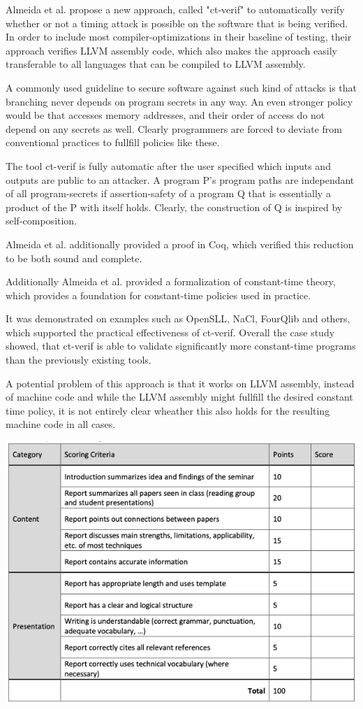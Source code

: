 \documentclass[a4paper,UKenglish]{lipics-v2018}
\begin{document}

Almeida et al. propose a new approach, called "ct-verif" to automatically verify whether  or not a timing attack is possible on the software that is being verified. In order to include most compiler-optimizations in their baseline of testing, their approach verifies LLVM assembly code, which also makes the approach easily transferable to all languages that can be compiled to LLVM assembly.\cite{verifying_constant_time_implementations}

A commonly used guideline to secure software against such kind of attacks is that branching never depends on program secrets in any way. An even stronger policy would be that accesses memory addresses, and their order of access do not depend on any secrets as well. Clearly programmers are forced to deviate from conventional practices to fullfill policies like these.\cite{verifying_constant_time_implementations}

The tool ct-verif is fully automatic after the user specified which inputs and outputs are public to an attacker. A program P's program paths are independant of all program-secrets if assertion-safety of a program Q that is essentially a product of the P with itself holds.\cite{verifying_constant_time_implementations} Clearly, the construction of Q is inspired by self-composition. 

Almeida et al. additionally provided a proof in Coq, which verified this reduction to be both sound and complete.\cite{verifying_constant_time_implementations}

Additionally Almeida et al. provided a formalization of constant-time theory, which provides a foundation for constant-time policies used in practice.

It was demonstrated on examples such as OpenSLL, NaCl, FourQlib and others, which supported the practical effectiveness of ct-verif. Overall the case study showed, that ct-verif is able to validate significantly more constant-time programs than the previously existing tools.\cite{verifying_constant_time_implementations}

A potential problem of this approach is that it works on LLVM assembly, instead of machine code and while the LLVM assembly might fullfill the desired constant time policy, it is not entirely clear wheather this also holds for the resulting machine code in all cases.\cite{verifying_constant_time_implementations}

\newpage
\includegraphics[scale = 0.72]{pictures/grading_scheme}\\

\newpage

\end{document}
